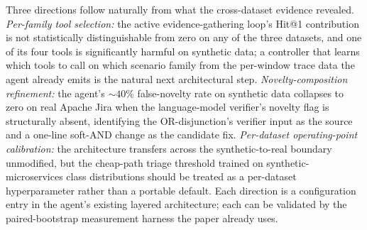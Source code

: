 Three directions follow naturally from what the cross-dataset evidence revealed. \emph{Per-family tool selection:} the active evidence-gathering loop's Hit@1 contribution is not statistically distinguishable from zero on any of the three datasets, and one of its four tools is significantly harmful on synthetic data; a controller that learns which tools to call on which scenario family from the per-window trace data the agent already emits is the natural next architectural step. \emph{Novelty-composition refinement:} the agent's $\sim$$40\%$ false-novelty rate on synthetic data collapses to zero on real Apache Jira when the language-model verifier's novelty flag is structurally absent, identifying the OR-disjunction's verifier input as the source and a one-line soft-AND change as the candidate fix. \emph{Per-dataset operating-point calibration:} the architecture transfers across the synthetic-to-real boundary unmodified, but the cheap-path triage threshold trained on synthetic-microservices class distributions should be treated as a per-dataset hyperparameter rather than a portable default. Each direction is a configuration entry in the agent's existing layered architecture; each can be validated by the paired-bootstrap measurement harness the paper already uses.
